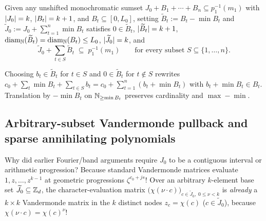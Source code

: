 \begin{lemma}\label{lem:sumset-shift}
Given any unshifted monochromatic sumset $J_0 + B_1 + \cdots + B_{n} \subseteq p_1^{-1}(m_1)$ with
$\lvert J_0 \rvert = k$, $\lvert B_t \rvert = k + 1$, and $B_t \subseteq [0, L_0]$, setting
$\widetilde{B}_t := B_t - \min B_t$ and $\widetilde{J}_0 := J_0 + \sum_{t=1}^n \min B_t$ satisfies
$0 \in \widetilde{B}_t$, $\lvert \widetilde{B}_t \rvert = k + 1$,
$\operatorname{diam}_{\mathbb{N}}(\widetilde{B}_t) = \operatorname{diam}_{\mathbb{N}}(B_t) \le L_0$, $\lvert \widetilde{J}_0 \rvert = k$, and
\[
  \widetilde{J}_0 + \sum_{t \in S} \widetilde{B}_t \;\subseteq\; p_1^{-1}(m_1)
  \qquad \text{for every subset } S \subseteq \{1,\dots,n\}.
\]
\end{lemma}
\begin{outline}
Choosing $b_t \in \widetilde{B}_t$ for $t \in S$ and $0 \in \widetilde{B}_t$ for $t \notin S$
rewrites $c_0 + \sum_t \min B_t + \sum_{t \in S} b_t = c_0 + \sum_{t=1}^n (b_t + \min B_t)$ with
$b_t + \min B_t \in B_t$. Translation by $-\min B_t$ on $\mathbb{N}_{\ge \min B_t}$ preserves cardinality
and $\max - \min$.
\end{outline}

\subsection{Arbitrary-subset Vandermonde pullback and sparse annihilating polynomials}\label{sec:sumsets-poly}

Why did earlier Fourier/band arguments require $J_0$ to be a contiguous interval or arithmetic
progression? Because standard Vandermonde matrices evaluate $1, z, \dots, z^{k-1}$ at geometric
progressions $\zeta^{c_0 + j s}$! Over an arbitrary $k$-element base set $\widetilde{J}_0 \subseteq
\mathbb{Z}_d$, the character-evaluation matrix $\bigl(\chi(\nu \cdot c)\bigr)_{c \in \widetilde{J}_0,\;
0 \le \nu < k}$ is \emph{already} a $k \times k$ Vandermonde matrix in the $k$ distinct nodes
$z_c = \chi(c)$ ($c \in \widetilde{J}_0$), because $\chi(\nu \cdot c) = \chi(c)^\nu$!


